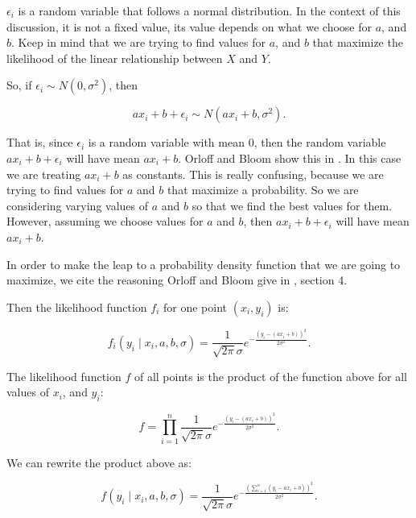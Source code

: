 \documentclass[a5paper,11pt]{article}
\begin{document}
$\epsilon_i$ is a random variable that follows a normal distribution.  In
the context of this discussion, it is not a fixed value, its value depends
on what we choose for $a$, and $b$.  Keep in mind that we are trying to find
values for $a$, and $b$ that maximize the likelihood of the linear relationship
between $X$ and $Y$.

So, if $\epsilon_i \sim N\left(0, \sigma^2\right)$, then 

\begin{equation}
ax_i + b + \epsilon_i \sim N\left(ax_i+b, \sigma^2 \right).
\end{equation}

That is, since $\epsilon_i$ is a random variable with mean $0$, then 
the random variable $ax_i+b + \epsilon_i$ will have mean $ax_i+b$.  Orloff
and Bloom show this in \cite{reading6a}.  In this case we are treating 
$ax_i + b$ as constants.  This is really confusing, because we are trying
to find values for $a$ and $b$ that maximize a probability. So we are 
considering varying values of $a$ and $b$ so that we find the best values
for them.  However, assuming we choose values for $a$ and $b$, then 
$ax_i+b+\epsilon_i$ will have mean $ax_i+b$.

In order to make the leap to a probability density function that we are
going to maximize, we cite the reasoning Orloff and Bloom give in 
\cite{reading10b}, section 4.

Then the likelihood function $f_i$ for one point $\left(x_i, y_i\right)$ is:

\begin{equation}
f_i\left(y_i \mid x_i, a, b, \sigma\right)
 = \frac{1}{\sqrt{2\pi}\sigma}
	e^{-\frac{\left(y_i -\left(ax_i+b\right)\right)^2}{2\sigma^2}}.
\end{equation}

The likelihood function $f$ of all points is the product of the function above
for all values of $x_i$, and $y_i$:

\begin{equation}
f
 = \prod_{i=1}^{n} \frac{1}{\sqrt{2\pi}\sigma}
	e^{-\frac{\left(y_i -\left(ax_i+b\right)\right)^2}{2\sigma^2}}.
\end{equation}

We can rewrite the product above as:

\begin{equation}
f\left(y_i \mid x_i, a, b, \sigma\right)
 =  \frac{1}{\sqrt{2\pi}\sigma}
	e^{-\frac{\left(\sum_{i=1}^{n} \left(y_i - ax_i+b\right)\right)^2}{2\sigma^2}}.
\end{equation}
\end{document}
